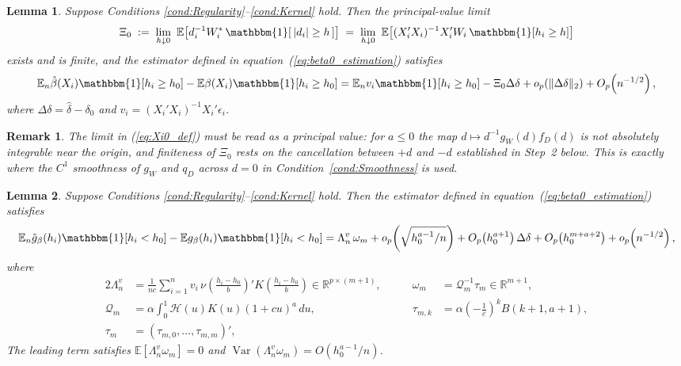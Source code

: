 \documentclass{article}
\newtheorem{remark}{Remark}
\newtheorem{lemma}{Lemma}
\newcommand{\normm}[1]{\lVert#1\rVert}
\newcommand{\E}{\mathbb{E}}
\newcommand{\R}{\mathbb{R}}
\newcommand{\I}{\mathbbm{1}}
\DeclareMathOperator{\Var}{Var}
\begin{document}
\begin{appendices}
\begin{lemma}\label{lemma:beta0_positive}
Suppose Conditions \ref{cond:Regularity}--\ref{cond:Kernel} hold. Then the
principal-value limit
\begin{align}\label{eq:Xi0_def}
    \Xi_0 \;:=\; \lim_{h\downarrow0}\
    \E\!\left[d_i^{-1}W_i^{*}\,\I[\,|d_i|\ge h\,]\right]
    \;=\;\lim_{h\downarrow0}\ \E\!\left[(X_i'X_i)^{-1}X_i'W_i\,\I[h_i\ge h]\right]
\end{align}
exists and is finite, and the estimator defined in
equation~(\ref{eq:beta0_estimation}) satisfies
\begin{align*}
    \E_n \hat{\beta}(X_i)\I[h_i\geq h_0] - \E \beta(X_i)\I[h_i\geq h_0]
    = \E_n v_i\I[h_i\geq h_0] - \Xi_0\Delta\delta
      + o_p\!\left(\normm{\Delta\delta}_2\right) + O_p\!\left(n^{-1/2}\right),
\end{align*}
where $\Delta\delta=\hat\delta-\delta_0$ and
$v_i=(X_i'X_i)^{-1}X_i'\epsilon_i$.
\end{lemma}

\begin{remark}
The limit in (\ref{eq:Xi0_def}) must be read as a principal value: for $a\le0$
the map $d\mapsto d^{-1}g_W(d)f_D(d)$ is not absolutely integrable near the
origin, and finiteness of $\Xi_0$ rests on the cancellation between $+d$ and
$-d$ established in Step~2 below. This is exactly where the $C^1$ smoothness of
$g_W$ and $q_D$ across $d=0$ in Condition~\ref{cond:Smoothness} is used.
\end{remark}


\begin{lemma}\label{lemma:beta0_negative}
Suppose Conditions \ref{cond:Regularity}--\ref{cond:Kernel} hold. Then the
estimator defined in equation~(\ref{eq:beta0_estimation}) satisfies
\begin{align*}
    \E_n \hat{g}_\beta(h_i)\I[h_i<h_0] - \E g_\beta(h_i)\I[h_i<h_0]
    = \Lambda_n^{v}\,\omega_m
      + o_p\!\left(\sqrt{h_0^{a-1}/n}\right)
      + O_p\!\left(h_0^{a+1}\right)\Delta\delta
      + O_p\!\left(h_0^{m+a+2}\right)
      + o_p\!\left(n^{-1/2}\right),
\end{align*}
where
\begin{alignat*}{2}
    \Lambda_n^{v} &= \frac{1}{nc}\sum_{i=1}^n v_i\,
        \nu\!\left(\tfrac{h_i-h_0}{b}\right)'K\!\left(\tfrac{h_i-h_0}{b}\right)
    \in\R^{p\times(m+1)},
    &\qquad
    \omega_m &= \mathcal{Q}_m^{-1}\tau_m\in\R^{m+1},\\
    \mathcal{Q}_m &=\alpha\int_{0}^{1}\mathcal{H}(u)K(u)(1+cu)^{a}\,du,
    &\qquad
    \tau_{m,k}&=\alpha\left(-\tfrac{1}{c}\right)^{k}B(k+1,a+1),\\
     \tau_m&=(\tau_{m,0},\dots,\tau_{m,m})',
\end{alignat*}
 The leading term satisfies
$\E\left[\Lambda_n^{v}\omega_m\right]=0$ and
$\Var\!\left(\Lambda_n^{v}\omega_m\right) =O\!\left(h_0^{a-1}/n\right)$.
\end{lemma}



\end{appendices}
\end{document}

